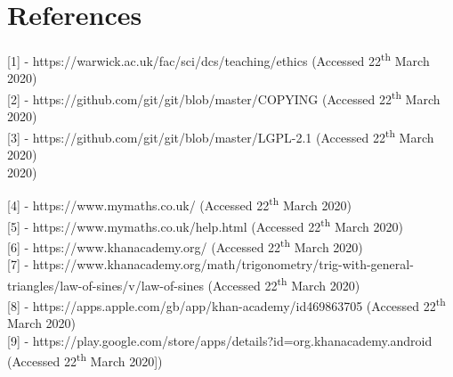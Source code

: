 \documentclass{article}
\begin{document}
\section{References}

[1] - https://warwick.ac.uk/fac/sci/dcs/teaching/ethics (Accessed 22\textsuperscript{th} March 2020) \\ 

[2] - https://github.com/git/git/blob/master/COPYING (Accessed 22\textsuperscript{th} March 2020) \\ 

[3] - https://github.com/git/git/blob/master/LGPL-2.1 (Accessed 22\textsuperscript{th} March 2020) \\  2020)

[4] - https://www.mymaths.co.uk/ (Accessed 22\textsuperscript{th} March 2020) \\ 

[5] - https://www.mymaths.co.uk/help.html (Accessed 22\textsuperscript{th} March 2020) \\

[6] - https://www.khanacademy.org/ (Accessed 22\textsuperscript{th} March 2020) \\

[7] - https://www.khanacademy.org/math/trigonometry/trig-with-general-triangles/law-of-sines/v/law-of-sines (Accessed 22\textsuperscript{th} March 2020) \\

[8] - https://apps.apple.com/gb/app/khan-academy/id469863705 (Accessed 22\textsuperscript{th} March 2020) \\ 

[9] - https://play.google.com/store/apps/details?id=org.khanacademy.android (Accessed 22\textsuperscript{th} March 2020])
\end{document}

